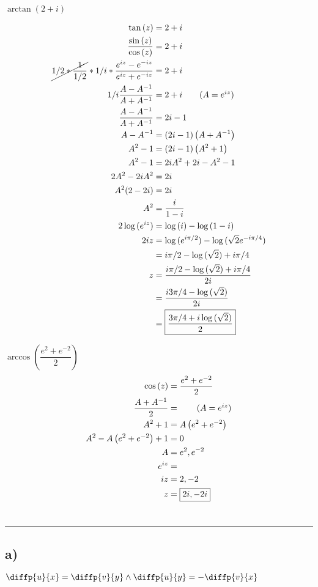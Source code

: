 \documentclass[12pt]{article}
\begin{document}
$\arctan{(2+i)}$

\begin{align*}
	\tan{(z)} &= 2+i\\
	\dfrac{\sin{(z)}}{\cos{(z)}} &= 2 + i\\
	\cancel{1/2 *\dfrac{1}{1/2}}  *1/i * \dfrac{e^{iz} - e^{-iz}}{e^{iz}+e^{-iz}} &= 2+i\\
	1/i \dfrac{A-A^{-1}}{A + A^{-1}} &= 2+i \tag{$A=e^{iz}$}\\
	\dfrac{A-A^{-1}}{A + A^{-1}} &= 2i-1\\
	A - A^{-1} &= (2i-1)\left(A+A^{-1}\right)\\
	A^2 - 1 &= (2i-1)\left(A^2+1\right)\\
	A^2 - 1 &= 2iA^2 + 2i -A^2 -1\\
	2A^2 -2iA^2 &= 2i\\
	A^2(2-2i) &= 2i\\
	A^2 &= \dfrac{i}{1-i}\\
	2 \log{(e^{iz})} &= \log{(i)} - \log{(1-i)}\\
	2iz &= \log{(e^{i\pi/2})} - \log{(\sqrt{2}e^{-i\pi/4})}\\
	&= i\pi/2 - \log{(\sqrt{2})} +i\pi/4\\
	z  &= \dfrac{i\pi/2 - \log{(\sqrt{2})} +i\pi/4}{2i}\\
	&= \dfrac{i3\pi/4 - \log{(\sqrt{2})}}{2i}\\
	&= \boxed{\dfrac{3\pi/4 + i\log{(\sqrt{2})}}{2}}
\end{align*}

$ \arccos{\left(\dfrac{e^2+e^{-2}}{2}\right)} $
\begin{align*}
	\cos{(z)} &= \dfrac{e^2+e^{-2}}{2}\\
	\dfrac{A + A^{-1}}{2} &= \tag{$A=e^{iz}$}\\
	A^2 + 1 &= A \left(e^2 + e^{-2}\right)\\
	A^2 - A\left(e^2 + e^{-2}\right) + 1 &= 0\\
	A &= e^2, e^{-2}\\
	e^{iz} &= \\
	iz &= 2, -2\\
	z &= \boxed{2i, -2i}
\end{align*}
\newpage
\section{}\hrule
\subsection{a)}
$\diffp{u}{x} = \diffp{v}{y} \land \diffp{u}{y} = -\diffp{v}{x}$ 
\end{document}
